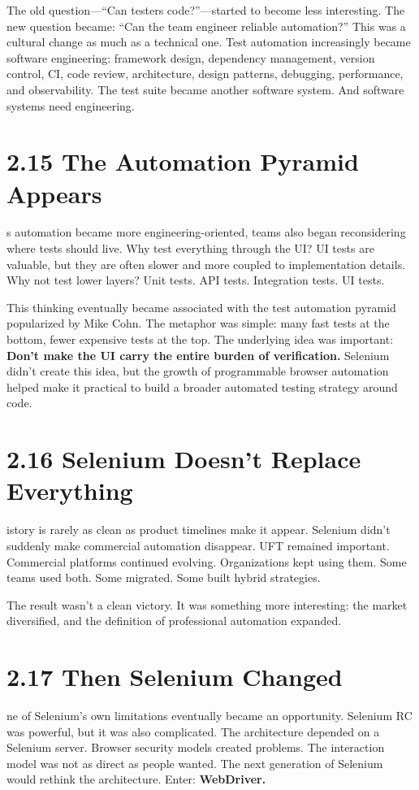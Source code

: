 \documentclass[11pt, a4paper, openany]{book}
\newcommand{\initialcap}[1]{{\fontfamily{lmss}\selectfont\huge\textbf{#1}}}
\begin{document}
The old question---``Can testers code?''---started to become less interesting. The new question became: ``Can the team engineer reliable automation?'' This was a cultural change as much as a technical one. Test automation increasingly became software engineering: framework design, dependency management, version control, CI, code review, architecture, design patterns, debugging, performance, and observability. The test suite became another software system. And software systems need engineering.

\section{2.15 The Automation Pyramid Appears}
\noindent \initialcap{A}s automation became more engineering-oriented, teams also began reconsidering where tests should live. Why test everything through the UI? UI tests are valuable, but they are often slower and more coupled to implementation details. Why not test lower layers? Unit tests. API tests. Integration tests. UI tests.

This thinking eventually became associated with the test automation pyramid popularized by Mike Cohn. The metaphor was simple: many fast tests at the bottom, fewer expensive tests at the top. The underlying idea was important: \textbf{Don't make the UI carry the entire burden of verification.} Selenium didn't create this idea, but the growth of programmable browser automation helped make it practical to build a broader automated testing strategy around code.

\section{2.16 Selenium Doesn't Replace Everything}
\noindent \initialcap{H}istory is rarely as clean as product timelines make it appear. Selenium didn't suddenly make commercial automation disappear. UFT remained important. Commercial platforms continued evolving. Organizations kept using them. Some teams used both. Some migrated. Some built hybrid strategies.

The result wasn't a clean victory. It was something more interesting: the market diversified, and the definition of professional automation expanded.

\section{2.17 Then Selenium Changed}
\noindent \initialcap{O}ne of Selenium's own limitations eventually became an opportunity. Selenium RC was powerful, but it was also complicated. The architecture depended on a Selenium server. Browser security models created problems. The interaction model was not as direct as people wanted. The next generation of Selenium would rethink the architecture. Enter: \textbf{WebDriver.}
\end{document}
